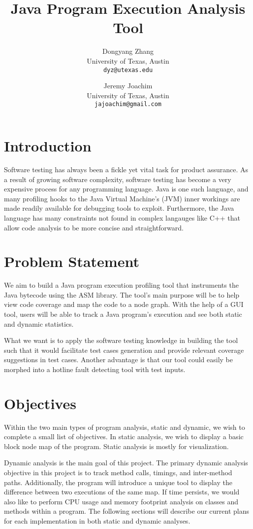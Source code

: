\documentclass{article}
\title{Java Program Execution Analysis Tool}
\author{
  Dongyang Zhang \\
  {\fontsize{10}{11}\selectfont University of Texas, Austin}\\ 
  \texttt{dyz@utexas.edu}
\and
  Jeremy Joachim \\
  {\fontsize{10}{11}\selectfont University of Texas, Austin}\\ 
  \texttt{jajoachim@gmail.com}
}
\begin{document}
\maketitle

\section{Introduction}

Software testing has always been a fickle yet vital task for product assurance.
As a result of growing software complexity, software testing has become a very expensive process for any programming language.
Java is one such language, and many profiling hooks to the Java Virtual Machine's (JVM) inner workings are made readily available for debugging tools to exploit.
Furthermore, the Java language has many constraints not found in complex langauges like C++ that allow code analysis to be more concise and straightforward.

\section{Problem Statement}

We aim to build a Java program execution profiling tool that instruments the Java bytecode using the ASM library.
The tool's main purpose will be to help view code coverage and map the code to a node graph.
With the help of a GUI tool, users will be able to track a Java program's execution and see both static and dynamic statistics.

What we want is to apply the software testing knowledge in building the tool such that it would facilitate test cases generation and provide relevant coverage suggestions in test cases.
Another advantage is that our tool could easily be morphed into a hotline fault detecting tool with test inputs.

\section{Objectives}

Within the two main types of program analysis, static and dynamic, we wish to complete a small list of objectives.
In static analysis, we wish to display a basic block node map of the program.
Static analysis is mostly for visualization.

Dynamic analysis is the main goal of this project.
The primary dynamic analysis objective in this project is to track method calls, timings, and inter-method paths.
Additionally, the program will introduce a unique tool to display the difference between two executions of the same map.
If time persists, we would also like to perform CPU usage and memory footprint analysis on classes and methods within a program.
The following sections will describe our current plans for each implementation in both static and dynamic analyses.
\end{document}
